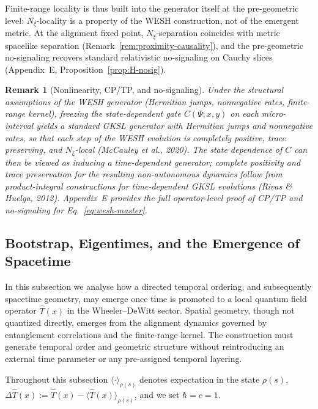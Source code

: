 \documentclass[12pt,a4paper]{article}
\newtheorem{remark}{Remark}[section]
\numberwithin{equation}{section}
\begin{document}
 \noindent Finite-range locality is thus built into the generator itself at the pre-geometric level: $N_\xi$-locality is a property of the WESH construction, not of the emergent metric. At the 
alignment fixed point, $N_\xi$-separation coincides with metric spacelike separation
(Remark~\ref{rem:proximity-causality}), and the pre-geometric no-signaling recovers
standard relativistic no-signaling on Cauchy slices (Appendix~E, Proposition~\ref{prop:H-nosig}).

\begin{remark}[Nonlinearity, CP/TP, and no-signaling]
\label{rem:nonlinear-cp}
Under the structural assumptions of the WESH generator (Hermitian jumps, nonneg\-ative rates, finite-range kernel), freezing the state-dependent
gate $C(\Psi;x,y)$ on each micro-interval yields a standard GKSL generator
with Hermitian jumps and nonnegative rates, so that each step of the WESH
evolution is completely positive, trace preserving, and $N_\xi$-local (McCauley
et al., 2020). The state dependence of $C$ can then be viewed as inducing a
time-dependent generator; complete positivity and trace preservation for the
resulting non-autonomous dynamics follow from product-integral constructions
for time-dependent GKSL evolutions (Rivas \& Huelga, 2012). Appendix~E
provides the full operator-level proof of CP/TP and no-signaling for
Eq.~\eqref{eq:wesh-master}.
\end{remark}

\subsection{Bootstrap, Eigentimes, and the Emergence of Spacetime}
\label{sec:eigentime-bootstrap}

\vspace{0.3cm}
In this subsection we analyse how a directed temporal ordering, and subsequently spacetime geometry, may emerge once time is promoted to a local quantum field operator $\hat T(x)$ in the Wheeler--DeWitt sector. Spatial geometry, though not quantized directly, emerges from the alignment dynamics governed by entanglement correlations and the finite-range kernel. The construction must generate temporal order and geometric structure without reintroducing an external time parameter or any pre-assigned temporal layering.

\vspace{0.3cm}

\noindent Throughout this subsection $\langle\cdot\rangle_{\rho(s)}$ denotes expectation in the state $\rho(s)$, $\Delta\hat T(x):=\hat T(x)-\langle\hat T(x)\rangle_{\rho(s)}$, and we set $\hbar=c=1$.
\end{document}

